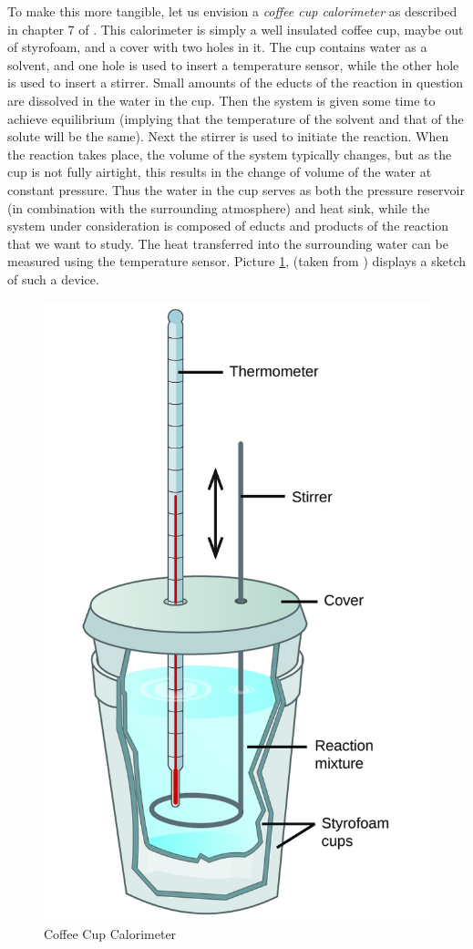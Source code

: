 \documentclass[a4paper, draft]{report}
\numberwithin{section}{chapter}
\numberwithin{equation}{chapter}
\theoremstyle{own}
\theoremstyle{remark}
\begin{document}
To make this more tangible, let us envision a {\em coffee cup calorimeter} as described in chapter 7 of \cite{Petrucci}. This calorimeter is simply a well insulated coffee cup, maybe out of styrofoam, and a cover with two holes in it. The cup contains water as a solvent, and one hole is used to insert a temperature sensor, while the other hole is used to insert a stirrer. Small amounts of the educts of the reaction in question are dissolved in the water in the cup. Then the system is given some time to achieve equilibrium (implying that the temperature of the solvent and that of the solute will be the same). Next the stirrer is used to initiate the reaction. When the reaction takes place, the volume of the system typically changes, but as the cup is not fully airtight, this results in the change of volume of the water at constant pressure. Thus the water in the cup serves as both the pressure reservoir (in combination with the surrounding atmosphere) and heat sink, while the system under consideration is composed of educts and products of the reaction that we want to study. The heat transferred into the surrounding water can be measured using the temperature sensor. Picture \ref{fig:coffeecupcalorimeter}, (taken from \cite{openstax} ) displays a sketch of such a device.

\begin{figure}
	\centering
	\includegraphics[width=0.2\linewidth]{CoffeeCupCalorimeter}
	\caption[Coffee Cup Calorimeter]{Coffee Cup Calorimeter}
	\label{fig:coffeecupcalorimeter}
\end{figure}
\end{document}
